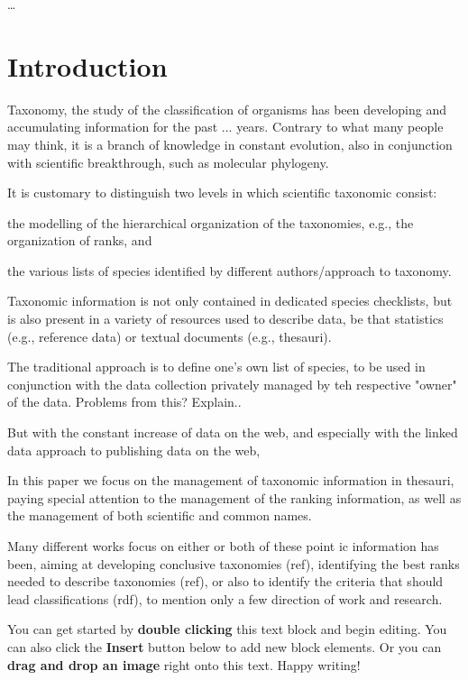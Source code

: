


\abstract


\ldots

\section{Introduction}

Taxonomy, the study of the classification of organisms has been developing and accumulating information for the past ... years. Contrary to what many people may think, it is a branch of knowledge in constant evolution, also in conjunction with scientific breakthrough, such as molecular phylogeny. 

It is customary to distinguish two levels in which scientific taxonomic consist:
\item the modelling of the hierarchical organization of the taxonomies, e.g., the organization of ranks, and 
\item the various lists of species identified by different authors/approach to taxonomy.

Taxonomic information is not only contained in dedicated species checklists, but is also present in a variety of resources used to describe data, be that statistics (e.g., reference data) or textual documents (e.g., thesauri).  

The traditional approach is to define one's own list of species, to be used in conjunction with the data collection privately managed by teh respective "owner" of the data. Problems from this? Explain..   

But with the constant increase of data on the web, and especially with the linked data approach to publishing data on the web, 

In this paper we focus on the management of taxonomic information in thesauri, paying special attention to the management of the ranking information, as well as the management of both scientific and common names. 

Many different works focus on either or both of these point  
ic information has been, aiming at developing conclusive taxonomies (ref), identifying the best ranks needed to describe taxonomies (ref), or also to identify the criteria that should lead classifications (rdf), to mention only a few direction of work and research.  

You can get started by \textbf{double clicking} this text block and begin editing. You can also click the \textbf{Insert} button below to add new block elements. Or you can \textbf{drag and drop an image} right onto this text. Happy writing!


